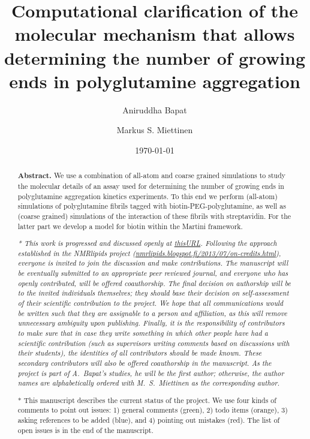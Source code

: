 \documentclass[a4paper,11pt,floatfix,authordate1-4,twocolumn]{revtex4-1}
\newcommand{\comment}[1]
{\todo[color=green!40]{\sffamily #1}} %
\newcommand{\reference}[1]
{\todo[color=blue!40]{\sffamily #1}} %
\newcommand{\wrong}[1]
{\todo[color=red!70]{\sffamily #1}} %
\begin{document}
\title{Computational clarification of the molecular mechanism that allows\\
 determining the number of growing ends in polyglutamine aggregation}

\author{Aniruddha Bapat}
\author{Markus S. Miettinen}

\date{\today}

\begin{abstract}
{\bf Abstract.}
We use a combination of all-atom and coarse grained simulations
to study the molecular details of an assay used for
determining the number of growing ends in polyglutamine
aggregation kinetics experiments.
%
To this end we perform (all-atom) simulations of
polyglutamine fibrils tagged with biotin-PEG-polyglutamine,
as well as (coarse grained) simulations of
the interaction of these fibrils with streptavidin.
%
For the latter part we develop a model for biotin
within the Martini framework.


\vspace{14pt}
{\it
* This work is progressed and discussed openly at \url{thisURL}.
Following the approach established in the NMRlipids project
(\url{nmrlipids.blogspot.fi/2013/07/on-credits.html}),
everyone is invited to join the discussion and make contributions.
The manuscript will be eventually submitted to an appropriate peer reviewed journal, and
everyone who has openly contributed, will be offered coauthorship.
The final decision on authorship will be to the invited individuals themselves;
they should base their decision on self-assessment of their scientific contribution to the project.
%
We hope that all communications would be written such that they are assignable
to a person and affiliation, as this will remove unnecessary ambiguity upon publishing.
%
Finally, it is the responsibility of contributors to make sure that in case they write something in which other people have had a scientific contribution (such as supervisors writing comments based on discussions with their students), the identities of all contributors should be made known. These secondary contributors will also be offered coauthorship in the manuscript.
%
As the project is part of A.~Bapat's studies, he will be the first author;
otherwise, the author names are alphabetically ordered with M.~S.~Miettinen as the corresponding author.

* This manuscript describes the current status of the project.
%
We use four kinds of comments to point out issues:
1) general comments \comment{\textbackslash comment} (green),
2) todo items  (orange),
3) asking references to be added \reference{\textbackslash reference} (blue), and
4) pointing out mistakes \wrong{\textbackslash wrong} (red).
%
The list of open issues is in the end of the manuscript.
}
\end{abstract}
\end{document}
